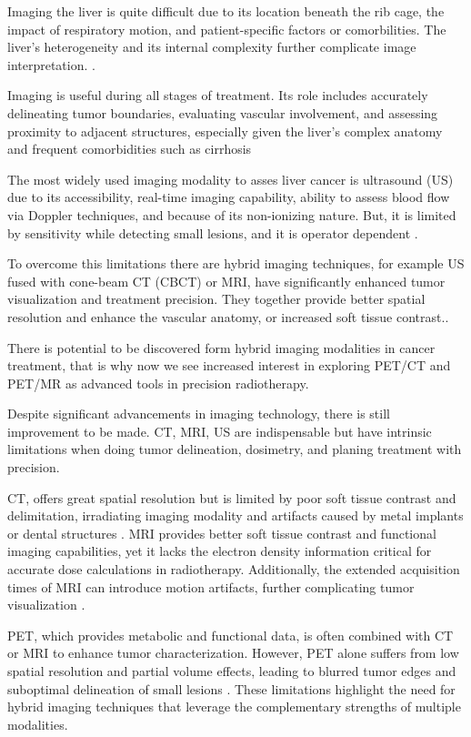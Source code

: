 \documentclass[11pt]{article} %
\begin{document}
\begin{multicols}{2}
Imaging the liver is quite difficult due to its location beneath the rib cage, the impact of respiratory motion, and patient-specific factors or comorbilities. The liver’s heterogeneity and its internal complexity further complicate image interpretation. \cite{ferraioli2018}.

Imaging is useful during all stages of treatment. Its role includes accurately delineating tumor boundaries, evaluating vascular involvement, and assessing proximity to adjacent structures, especially given the liver's complex anatomy and frequent comorbidities such as cirrhosis \cite{floridi2022}

The most widely used imaging modality to asses liver cancer is ultrasound (US) due to its accessibility, real-time imaging capability, ability to assess blood flow via Doppler techniques, and because of its non-ionizing nature. But, it is limited by sensitivity while detecting small lesions, and it is operator dependent \cite{mcmahon2023,ferraioli2018}. %

To overcome this limitations there are hybrid imaging techniques, for example US fused with cone-beam CT (CBCT) or MRI, have significantly enhanced tumor visualization and treatment precision. They together provide better spatial resolution and enhance the vascular anatomy, or increased soft tissue contrast.\cite{floridi2022}. %

There is potential to be discovered form hybrid imaging modalities in cancer treatment, that is why now we see increased interest in exploring PET/CT and PET/MR as advanced tools in precision radiotherapy.

Despite significant advancements in imaging technology, there is still improvement to be made. CT, MRI, US are indispensable but have intrinsic limitations when doing tumor delineation, dosimetry, and planing treatment with precision.

CT, offers great spatial resolution but is limited by poor soft tissue contrast and delimitation, irradiating imaging modality and artifacts caused by metal implants or dental structures \cite{decazes2021}. MRI provides better soft tissue contrast and functional imaging capabilities, yet it lacks the electron density information critical for accurate dose calculations in radiotherapy. Additionally, the extended acquisition times of MRI can introduce motion artifacts, further complicating tumor visualization \cite{floridi2022}.

PET, which provides metabolic and functional data, is often combined with CT or MRI to enhance tumor characterization. However, PET alone suffers from low spatial resolution and partial volume effects, leading to blurred tumor edges and suboptimal delineation of small lesions \cite{yan2024}. These limitations highlight the need for hybrid imaging techniques that leverage the complementary strengths of multiple modalities.


\end{multicols}
\end{document}
